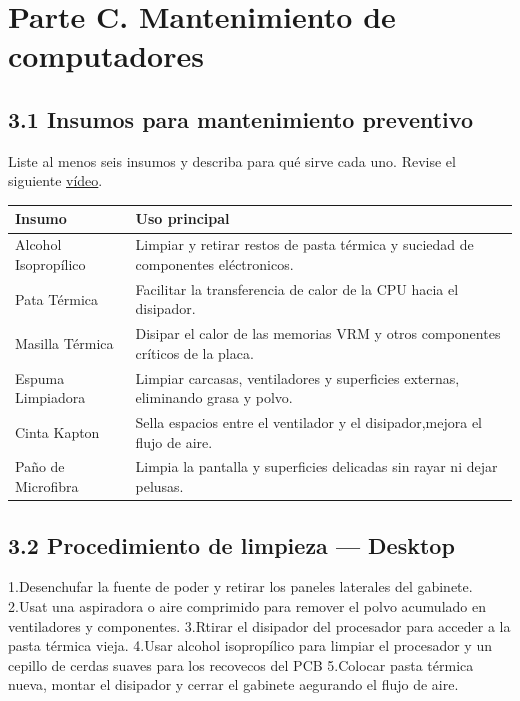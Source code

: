 \documentclass{article}
\begin{document}
\section{Parte C. Mantenimiento de computadores}
\label{sec:orgc8d6d6f}

\subsection{3.1 Insumos para mantenimiento preventivo}
\label{sec:orge60f57e}
Liste al menos seis insumos y describa para qué sirve cada
uno. Revise el siguiente \href{https://youtu.be/3ri1BMV7XTM?si=bjYoDUUKuMWwj4Qg}{vídeo}.

\begin{center}
\begin{tabular}{ll}
Insumo & Uso principal\\[0pt]
\hline
Alcohol Isopropílico & Limpiar y retirar restos de pasta térmica y suciedad de componentes eléctronicos.\\[0pt]
Pata Térmica & Facilitar la transferencia de calor de la CPU hacia el disipador.\\[0pt]
Masilla Térmica & Disipar el calor de las memorias VRM y otros componentes críticos de la placa.\\[0pt]
Espuma Limpiadora & Limpiar carcasas, ventiladores y superficies externas, eliminando grasa y polvo.\\[0pt]
Cinta Kapton & Sella espacios entre el ventilador y el disipador,mejora el flujo de aire.\\[0pt]
Paño de Microfibra & Limpia la pantalla y superficies delicadas sin rayar ni dejar pelusas.\\[0pt]
\end{tabular}
\end{center}

\subsection{3.2 Procedimiento de limpieza — Desktop}
\label{sec:org81bccb2}
1.Desenchufar la fuente de poder y retirar los paneles laterales
del gabinete.
2.Usat una aspiradora o aire comprimido para remover el polvo
acumulado en ventiladores y componentes.
3.Rtirar el disipador del procesador para acceder a la pasta
térmica vieja.
4.Usar alcohol isopropílico para limpiar el procesador y un cepillo
de cerdas suaves para los recovecos del PCB
5.Colocar pasta térmica nueva, montar el disipador y cerrar el
gabinete aegurando el flujo de aire.
\end{document}
